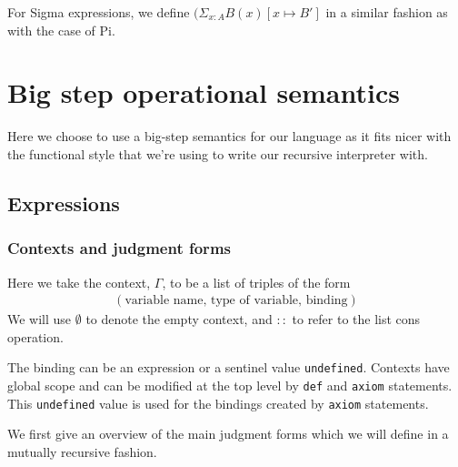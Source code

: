 \documentclass{article}
\begin{document}
For Sigma expressions, we define $(\Sigma_{x : A} B(x) [x \mapsto B']$ in a
similar fashion as with the case of Pi.

\section{Big step operational semantics}
Here we choose to use a big-step semantics for our language as it fits nicer
with the functional style that we're using to write our recursive interpreter with.
\begin{comment}
  https://www.andres-loeh.de/LambdaPi/LambdaPi.pdf
  http://math.andrej.com/2012/11/08/how-to-implement-dependent-type-theory-i/
  
  http://fsl.cs.illinois.edu/images/archive/b/b3/20110221180817!CS522-Spring-2011-PL-book-bigstep.pdf
  https://www.cs.cornell.edu/courses/cs4110/2010fa/lectures/lecture03.pdf
\end{comment}

\subsection{Expressions}
\subsubsection{Contexts and judgment forms}
Here we take the context, $\Gamma$, to be a list of triples of the form
\begin{align*}
  (\text{variable name}, \, \text{type of variable}, \, \text{binding})
\end{align*}
We will use $\emptyset$ to denote the empty context, and $::$ to refer to the
list cons operation.

The binding can be an expression or a sentinel value \verb|undefined|.
Contexts have global scope and can be modified at the top level by \verb|def|
and \verb|axiom| statements. This \verb|undefined| value is used for the
bindings created by \verb|axiom| statements.

We first give an overview of the main judgment forms which we will define in a
mutually recursive fashion.
\end{document}

